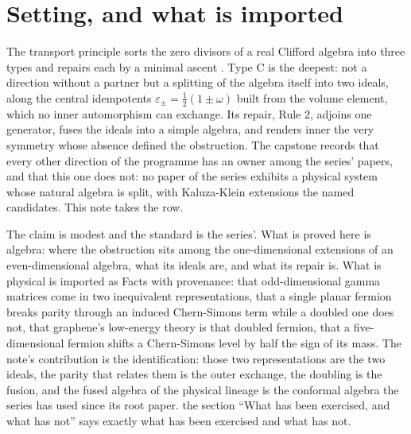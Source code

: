 \documentclass[11pt]{article}
\theoremstyle{definition}
\theoremstyle{plain}
\begin{document}
\noindent{}
\newpage

\section{Setting, and what is imported}

\label{c:note.rule2.setting-setting-what-imported}
The transport principle sorts the zero divisors of a real Clifford algebra into three types and repairs each by a minimal ascent \cite{ButlerT1}. Type C is the deepest: not a direction without a partner but a splitting of the algebra itself into two ideals, along the central idempotents $\varepsilon_\pm = \tfrac12(1 \pm \omega)$ built from the volume element, which no inner automorphism can exchange. Its repair, Rule 2, adjoins one generator, fuses the ideals into a simple algebra, and renders inner the very symmetry whose absence defined the obstruction. The capstone \cite{ButlerT17} records that every other direction of the programme has an owner among the series' papers, and that this one does not: no paper of the series exhibits a physical system whose natural algebra is split, with Kaluza-Klein extensions the named candidates. This note takes the row.

The claim is modest and the standard is the series'. What is proved here is algebra: where the obstruction sits among the one-dimensional extensions of an even-dimensional algebra, what its ideals are, and what its repair is. What is physical is imported as Facts with provenance: that odd-dimensional gamma matrices come in two inequivalent representations, that a single planar fermion breaks parity through an induced Chern-Simons term while a doubled one does not, that graphene's low-energy theory is that doubled fermion, that a five-dimensional fermion shifts a Chern-Simons level by half the sign of its mass. The note's contribution is the identification: those two representations are the two ideals, the parity that relates them is the outer exchange, the doubling is the fusion, and the fused algebra of the physical lineage is the conformal algebra the series has used since its root paper. the section ``What has been exercised, and what has not'' says exactly what has been exercised and what has not.
\end{document}
